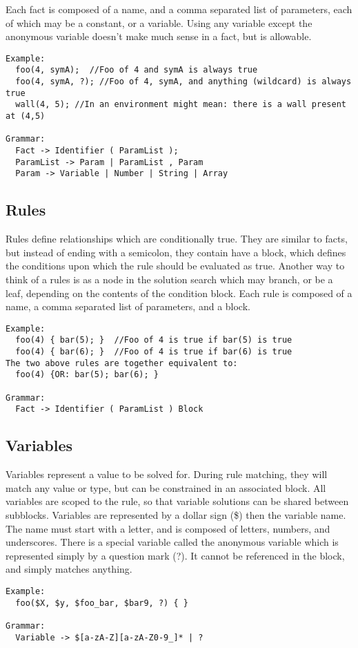 \documentclass[onecolumn,titlepage]{article}
\begin{document}
Each fact is composed of a name, and a comma separated list of parameters, each of which may
be a constant, or a variable.  Using any variable except the anonymous variable doesn't make
much sense in a fact, but is allowable.
\begin{verbatim}
Example:
  foo(4, symA);  //Foo of 4 and symA is always true
  foo(4, symA, ?); //Foo of 4, symA, and anything (wildcard) is always true
  wall(4, 5); //In an environment might mean: there is a wall present at (4,5)

Grammar:
  Fact -> Identifier ( ParamList );
  ParamList -> Param | ParamList , Param
  Param -> Variable | Number | String | Array
\end{verbatim}

\subsection{Rules}
Rules define relationships which are conditionally true.  They are similar to facts, but
instead of ending with a semicolon, they contain have a block, which defines the conditions
upon which the rule should be evaluated as true.  Another way to think of a rules is as
a node in the solution search which may branch, or be a leaf, depending on the contents
of the condition block. Each rule is composed of a name, a comma separated list of parameters,
and a block.

\begin{verbatim}
Example:
  foo(4) { bar(5); }  //Foo of 4 is true if bar(5) is true
  foo(4) { bar(6); }  //Foo of 4 is true if bar(6) is true
The two above rules are together equivalent to:
  foo(4) {OR: bar(5); bar(6); }

Grammar:
  Fact -> Identifier ( ParamList ) Block
\end{verbatim}

\subsection{Variables}
Variables represent a value to be solved for.  During rule matching, they will match any
value or type, but can be constrained in an associated block.  All variables are scoped to
the rule, so that variable solutions can be shared between subblocks.
Variables are represented by a dollar sign (\$) then the variable name. The name must
start with a letter, and is composed of letters, numbers, and underscores.  There is a special
variable called the anonymous variable which is represented simply by a question mark (?).  It
cannot be referenced in the block, and simply matches anything.
\begin{verbatim}
Example:
  foo($X, $y, $foo_bar, $bar9, ?) { }

Grammar:
  Variable -> $[a-zA-Z][a-zA-Z0-9_]* | ?
\end{verbatim}
\end{document}
